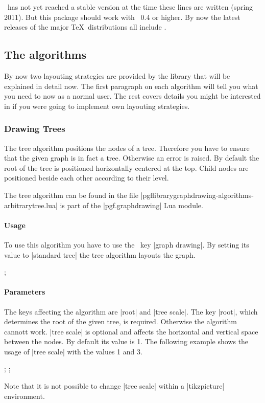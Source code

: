 \LuaTeX\ has not yet reached a stable version at the time these lines are written
(spring 2011). But this package should work with \LuaTeX\ 0.4 or higher. By now
the latest releases of the major \TeX\ distributions all include \LuaTeX.

\subsection{The algorithms}
By now two layouting strategies are provided by the library that will be explained in detail now. 
The first paragraph on each algorithm will tell you what you need to now as a normal user. The rest covers details you might be interested in if you were going to implement own layouting strategies.
\subsubsection{Drawing Trees}
The tree algorithm positions the nodes of a tree. Therefore you have to ensure that the given graph is in fact a tree. Otherwise an error is raised. By default the root of the tree is positioned horizontally centered at the top. Child nodes are positioned beside each other according to their level. 

The tree algorithm can be found in the file |pgflibrarygraphdrawing-algorithms-arbitrarytree.lua| is part of the |pgf.graphdrawing| Lua module.

\paragraph{Usage} 

To use this algorithm you have to use the \tikzname\ key |graph drawing|. By setting its value to |standard tree| the tree algorithm layouts the graph.
\begin{codeexample}[]
\tikzpicture[graph drawing=standard tree]
  ;
\endtikzpicture
\end{codeexample}
\paragraph{Parameters} 
The keys affecting the algorithm are |root| and |tree scale|. The key |root|, which determines the root of the given tree, is required. Otherwise the algorithm cannott work. |tree scale| is optional and affects the horizontal and vertical space between the nodes. By default its value is 1. The following example shows the usage of |tree scale| with the values 1 and 3.
\begin{codeexample}[]
\tikzpicture[graph drawing={standard tree, tree scale=1}]
  ;
\endtikzpicture
\tikzpicture[graph drawing={standard tree, tree scale=3}]
  ;
\endtikzpicture
\end{codeexample}
Note that it is not possible to change |tree scale| within a |tikzpicture| environment.

